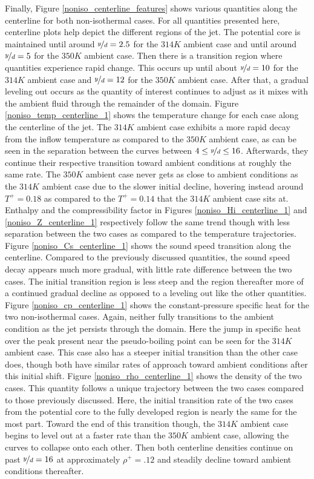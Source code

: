 Finally, Figure \ref{noniso_centerline_features} shows various quantities along the centerline for both non-isothermal cases. For all quantities presented here, centerline plots help depict the different regions of the jet. The potential core is maintained until around $\nicefrac{y}{d} = 2.5$ for the $314 K$ ambient case and until around $\nicefrac{y}{d}= 5$ for the $350 K$ ambient case. Then there is a transition region where quantities experience rapid change. This occurs up until about $\nicefrac{y}{d}= 10$ for the $314 K$ ambient case and $\nicefrac{y}{d} = 12$ for the $350 K$ ambient case. After that, a gradual leveling out occurs as the quantity of interest continues to adjust as it mixes with the ambient fluid through the remainder of the domain. Figure \ref{noniso_temp_centerline_1} shows the temperature change for each case along the centerline of the jet. The $314 K$ ambient case exhibits a more rapid decay from the inflow temperature as compared to the $350 K$ ambient case, as can be seen in the separation between the curves between $4 \leq \nicefrac{y}{d} \leq 16$. Afterwards, they continue their respective transition toward ambient conditions at roughly the same rate. The $350 K$ ambient case never gets as close to ambient conditions as the $314 K$ ambient case due to the slower initial decline, hovering instead around $T^+=0.18$ as compared to the $T^+=0.14$ that the $314 K$ ambient case sits at. Enthalpy and the compressibility factor in Figures \ref{noniso_Hi_centerline_1} and \ref{noniso_Z_centerline_1} respectively follow the same trend though with less separation between the two cases as compared to the temperature trajectories. Figure \ref{noniso_Cs_centerline_1} shows the sound speed transition along the centerline. Compared to the previously discussed quantities, the sound speed decay appears much more gradual, with little rate difference between the two cases. The initial transition region is less steep and the region thereafter more of a continued gradual decline as opposed to a leveling out like the other quantities. Figure \ref{noniso_cp_centerline_1} shows the constant-pressure specific heat for the two non-isothermal cases. Again, neither fully transitions to the ambient condition as the jet persists through the domain. Here the jump in specific heat over the peak present near the pseudo-boiling point can be seen for the $314 K$ ambient case. This case also has a steeper initial transition than the other case does, though both have similar rates of approach toward ambient conditions after this initial shift. Figure \ref{noniso_rho_centerline_1} shows the density of the two cases. This quantity follows a unique trajectory between the two cases compared to those previously discussed. Here, the initial transition rate of the two cases from the potential core to the fully developed region is nearly the same for the most part. Toward the end of this transition though,  the $314 K$ ambient case begins to level out at a faster rate than the $350 K$ ambient case, allowing the curves to collapse onto each other. Then both centerline densities continue on past $\nicefrac{y}{d} = 16$ at approximately $\rho^+ = .12$ and steadily decline toward ambient conditions thereafter. 
